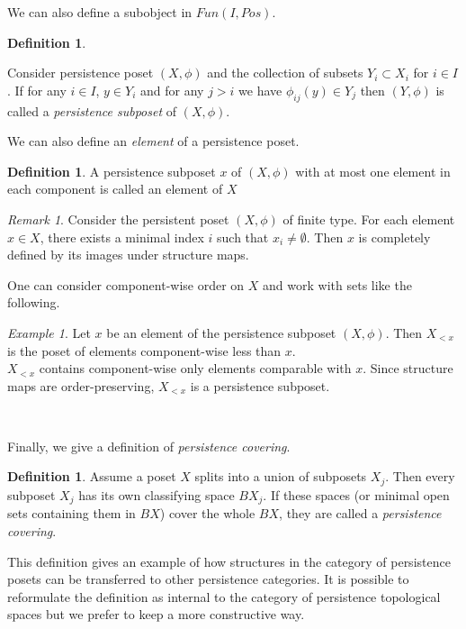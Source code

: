 \documentclass[english,12pt]{article}
\newcounter{stmcounter}[section]
\numberwithin{equation}{section}
\theoremstyle{definition}
\newtheorem{definition}[stmcounter]{Definition}
\theoremstyle{remark}
\newtheorem{remark}[stmcounter]{Remark}
\newtheorem{example}[stmcounter]{Example}
\newcommand{\define}[1]{{\textit{#1}}}
\begin{document}
We can also define a subobject in $Fun(I, Pos)$.

\begin{definition} ~ \par
  Consider persistence poset $(X,\phi)$ and the collection of subsets $Y_i \subset X_i$ for $i \in I$.
  If for any $i \in I$, $y \in Y_i$ and for any $j>i$ we have $\phi_{ij}(y) \in Y_j$ then $(Y,\phi)$ is called a \define{persistence subposet} of $(X,\phi)$.
\end{definition}

We can also define an \define{element} of a persistence poset.
\begin{definition}
  A persistence subposet $x$ of $(X,\phi)$ with at most one element in each component is called an element of $X$
\end{definition}

\begin{remark}
  Consider the persistent poset $(X, \phi)$ of finite type. For each element $x \in X$, there exists a minimal index $i$ such that $x_i \neq \emptyset$. Then $x$ is completely defined by its images under structure maps.
\end{remark}

One can consider component-wise order on $X$ and work with sets like the following.
\begin{example}
  Let $x$ be an element of the persistence subposet $(X, \phi)$. Then $X_{<x}$ is the poset of elements component-wise less than $x$.\\

  $X_{<x}$ contains component-wise only elements comparable with $x$. Since structure maps are order-preserving, $X_{<x}$ is a persistence subposet.
\end{example} ~ \par

Finally, we give a definition of \define{persistence covering}.\\

\begin{definition}
  Assume a poset $X$ splits into a union of subposets $X_j$. Then every subposet $X_j$ has its own classifying space $BX_j$. If these spaces (or minimal open sets containing them in $BX$) cover the whole $BX$, they are called a \define{persistence covering}.
\end{definition}

This definition gives an example of how structures in the category of persistence posets can be transferred to other persistence categories. It is possible to reformulate the definition as internal to the category of persistence topological spaces but we prefer to keep a more constructive way.
\end{document}
